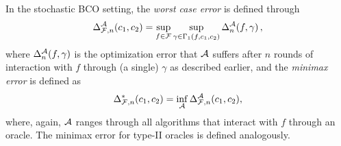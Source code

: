 In the stochastic BCO setting, the \emph{worst case error} is defined through
\begin{align}
\label{eq:minimaxerrdef}
\Delta_{\F,n}^\cA(c_1,c_2)
= \sup_{f \in \cF} \sup_{\gamma\in \Gamma_1(f,c_1,c_2)}  \Delta_n^{\cA}(f,\gamma)\,, %
\end{align}
where $\Delta_n^{\mathcal{A}}(f,\gamma)$ is the optimization error that $\mathcal{A}$ suffers
after $n$ rounds of interaction with $f$ through (a single) $\gamma$ as described earlier, and the \emph{minimax error}
is defined as
\[
\Delta_{\mathcal{F},n}^*(c_1,c_2) =  \inf_{\mathcal{A}} \Delta_{\mathcal{F},n}^{\mathcal{A}}(c_1,c_2),
\]
where, again, $\mathcal{A}$ ranges through all algorithms that interact with $f$ through an oracle.
The minimax error for type-II oracles is defined analogously.


